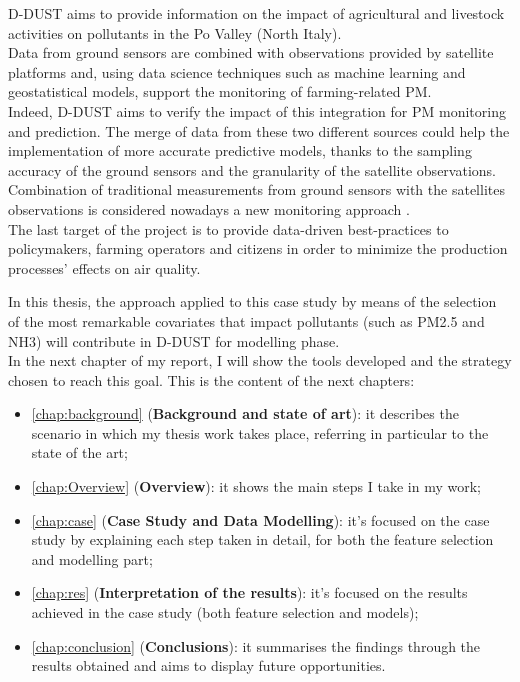 D-DUST aims to provide information on the impact of agricultural and livestock activities on pollutants in the Po Valley (North Italy).\\
Data from ground sensors are combined with observations provided by satellite platforms and, using data science techniques such as machine learning and geostatistical models, support the monitoring of farming-related PM.\\
Indeed, D-DUST aims to verify the impact of this integration for PM monitoring and prediction. 
The merge of data from these two different sources could help the implementation of more accurate predictive models, thanks to the sampling accuracy of the ground sensors and the granularity of the satellite observations.\\
Combination of traditional measurements from ground sensors with the satellites observations is considered nowadays a new monitoring approach \cite{de2018modelling}.\\
The last target of the project is to provide data-driven best-practices to policymakers, farming operators and citizens in order to minimize the production processes' effects on air quality.\par
In this thesis, the approach applied to this case study by means of the selection of the most remarkable covariates that impact pollutants (such as PM2.5 and NH3) will contribute in D-DUST for modelling phase.\\
In the next chapter of my report, I will show the tools developed and the strategy chosen to reach this goal. 
This is the content of the next chapters:

\begin{itemize}
  \item \autoref{chap:background} (\textbf{Background and state of art}): it describes the scenario in which my thesis work takes place, referring in particular to the state of the art;
  \item \autoref{chap:Overview} (\textbf{Overview}): it shows the main steps I take in my work;
  \item \autoref{chap:case} (\textbf{Case Study and Data Modelling}): it's focused on the case study by explaining each step taken in detail, for both the feature selection and modelling part;
 \item \autoref{chap:res} (\textbf{Interpretation of the results}): it's focused on the results achieved in the case study (both feature selection and models);
 \item \autoref{chap:conclusion} (\textbf{Conclusions}): it summarises the findings through the results obtained and aims to display future opportunities.  
\end{itemize}